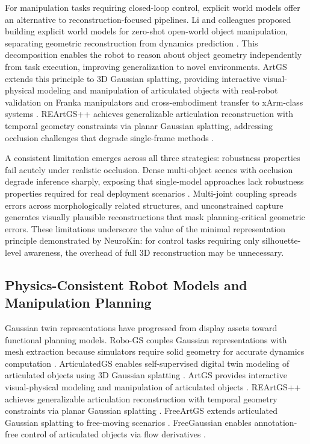 \documentclass[12pt,a4paper,oneside]{report}
\begin{document}
For manipulation tasks requiring closed-loop control, explicit world models offer an alternative to reconstruction-focused pipelines. Li and colleagues proposed building explicit world models for zero-shot open-world object manipulation, separating geometric reconstruction from dynamics prediction \cite{li2024explicit}. This decomposition enables the robot to reason about object geometry independently from task execution, improving generalization to novel environments. ArtGS extends this principle to 3D Gaussian splatting, providing interactive visual-physical modeling and manipulation of articulated objects with real-robot validation on Franka manipulators and cross-embodiment transfer to xArm-class systems \cite{yu2025artgs}. REArtGS++ achieves generalizable articulation reconstruction with temporal geometry constraints via planar Gaussian splatting, addressing occlusion challenges that degrade single-frame methods \cite{wu2025reartgs}.

A consistent limitation emerges across all three strategies: robustness properties fail acutely under realistic occlusion. Dense multi-object scenes with occlusion degrade inference sharply, exposing that single-model approaches lack robustness properties required for real deployment scenarios \cite{li2025art, zhang2025simart}. Multi-joint coupling spreads errors across morphologically related structures, and unconstrained capture generates visually plausible reconstructions that mask planning-critical geometric errors. These limitations underscore the value of the minimal representation principle demonstrated by NeuroKin: for control tasks requiring only silhouette-level awareness, the overhead of full 3D reconstruction may be unnecessary.

\subsection{Physics-Consistent Robot Models and Manipulation Planning}
\label{subsec:physics_consistent_robot_models_and_manipulation_planning}

Gaussian twin representations have progressed from display assets toward functional planning models. Robo-GS couples Gaussian representations with mesh extraction because simulators require solid geometry for accurate dynamics computation \cite{lou2024robogs}. ArticulatedGS enables self-supervised digital twin modeling of articulated objects using 3D Gaussian splatting \cite{guo2025articulatedgs}. ArtGS provides interactive visual-physical modeling and manipulation of articulated objects \cite{yu2025artgs}. REArtGS++ achieves generalizable articulation reconstruction with temporal geometry constraints via planar Gaussian splatting \cite{wu2025reartgs}. FreeArtGS extends articulated Gaussian splatting to free-moving scenarios \cite{dai2025freeartgs}. FreeGaussian enables annotation-free control of articulated objects via flow derivatives \cite{chen2025freegaussian}.
\end{document}
